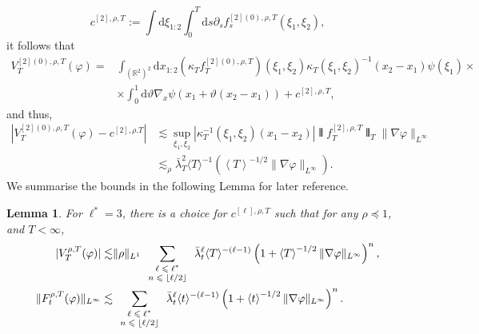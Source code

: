 \documentclass[11pt, a4paper]{scrartcl}
\numberwithin{equation}{section}
\theoremstyle{plain}
\newtheorem{lemma}[foo]{Lemma}
\theoremstyle{remark}
\newcommand{\assign}{:=}
\newcommand{\mathd}{\mathrm{d}}
\newcommand{\tmscript}[1]{\text{\scriptsize{$#1$}}}
\begin{document}
\begin{equation}\label{eq:def-counterterm}
  c^{[2], \rho, T} \assign  \int \mathd \xi_{1 : 2}
   \int_0^T \mathd s \partial_s{f}_s^{[2] (0), \rho, T} (\xi_1, \xi_2), 
\end{equation}
it follows that
\begin{align*}
  V^{[2] (0), \rho, T}_T (\varphi) =& 
  \int_{(\mathbb{R}^2)^2} \mathd
  x_{1 : 2} (\kappa_T f_T^{[2] (0), \rho, T}) (\xi_1, \xi_2) \kappa_T (\xi_1,
  \xi_2)^{- 1} (x_2 - x_1) \psi (\xi_1)\times \\
  &\times \int_0^1 \mathd \vartheta \nabla_x
  \psi (x_1 + \vartheta (x_2 - x_1)) + c^{[2], \rho, T},
\end{align*}
and thus,
\begin{equation}\label{eq:V2-bound}
  \begin{aligned}
       | V_T^{[2] (0), \rho, T} (\varphi) - c^{[2], \rho .T} | & \lesssim 
       \sup_{\xi_1, \xi_2} | \kappa_T^{-1} (\xi_1, \xi_2) (x_1 - x_2) |  \interleave
       f_T^{[2], \rho, T} \interleave_T  \| \nabla \varphi \|_{L^{\infty}}\\
       & \lesssim_{\rho}  \bar{\lambda}_T^2 \langle T \rangle^{- 1}  \left(
       \left\langle T \right\rangle^{- 1 / 2} \| \nabla \varphi
       \|_{L^{\infty}} \right) .
     \end{aligned}
\end{equation}
We summarise the bounds in the following Lemma for later reference.
\begin{lemma}
  \label{lem:F2-W1-bounds}For $\ell^{\ast} = 3$, there is a choice for
  $c^{[\ell], \rho, T}$ such that for any $\rho \preceq  1$, and $T <
  \infty$,
  \begin{equation}
    \begin{aligned}
      | V_T^{\rho, T} (\varphi) | \lesssim & \| \rho \|_{L^1} 
      \sum_{\tmscript{\begin{array}{c}
        \ell \leqslant \ell^{\ast}\\
        n \leqslant \lfloor{\ell / 2}\rfloor
      \end{array}}} \bar{\lambda}_t^{\ell} \langle T \rangle^{- (\ell - 1)}  \left(
      1 + \left\langle T \right\rangle^{- 1 / 2} \| \nabla
      \varphi \|_{L^{\infty}} \right)^n,\\
      \| F_t^{\rho, T} (\varphi) \|_{L^{\infty}} \lesssim &
      \sum_{\tmscript{\begin{array}{c}
        \ell \leqslant \ell^{\ast}\\
        n \leqslant \lfloor{\ell / 2}\rfloor
      \end{array}}} \bar{\lambda}_t^{\ell} \langle t \rangle^{- (\ell - 1)}  \left(
      1 + \left\langle t \right\rangle^{- 1 / 2} \| \nabla
      \varphi \|_{L^{\infty}} \right)^n .
    \end{aligned} \label{eq:F2-W1-bounds}
  \end{equation}
\end{lemma}
\end{document}
